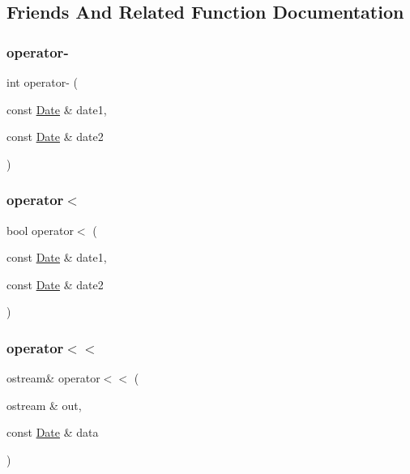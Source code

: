 \subsection{Friends And Related Function Documentation}
\hypertarget{class_date_ac5bf05534baacb5dc11f6abbb4e1f621}{}\label{class_date_ac5bf05534baacb5dc11f6abbb4e1f621} 
\subsubsection{\texorpdfstring{operator-\/}{operator-}}
{\footnotesize\ttfamily int operator-\/ (\begin{DoxyParamCaption}\item[{const \hyperlink{class_date}{Date} \&}]{date1,  }\item[{const \hyperlink{class_date}{Date} \&}]{date2 }\end{DoxyParamCaption})\hspace{0.3cm}{\ttfamily [friend]}}

\hypertarget{class_date_aa2e695ccf211714fafbc8c73cb7e5419}{}\label{class_date_aa2e695ccf211714fafbc8c73cb7e5419} 
\subsubsection{\texorpdfstring{operator$<$}{operator<}}
{\footnotesize\ttfamily bool operator$<$ (\begin{DoxyParamCaption}\item[{const \hyperlink{class_date}{Date} \&}]{date1,  }\item[{const \hyperlink{class_date}{Date} \&}]{date2 }\end{DoxyParamCaption})\hspace{0.3cm}{\ttfamily [friend]}}

\hypertarget{class_date_a7f6a6b50c5a5aca26dd5b5631c2f5c43}{}\label{class_date_a7f6a6b50c5a5aca26dd5b5631c2f5c43} 
\subsubsection{\texorpdfstring{operator$<$$<$}{operator<<}}
{\footnotesize\ttfamily ostream\& operator$<$$<$ (\begin{DoxyParamCaption}\item[{ostream \&}]{out,  }\item[{const \hyperlink{class_date}{Date} \&}]{data }\end{DoxyParamCaption})\hspace{0.3cm}{\ttfamily [friend]}}

